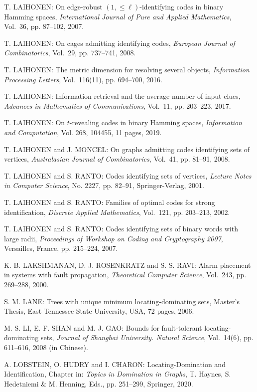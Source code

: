 \begin{thebibliography}{999}
T. LAIHONEN: On edge-robust $(1,\leq\ell)$-identifying codes in binary Hamming spaces, {\it International Journal of Pure and Applied Mathematics}, Vol.~36, pp. 87--102, 2007.

T. LAIHONEN: On cages admitting identifying codes, {\it European Journal of Combinatorics}, Vol.~29, pp. 737--741, 2008.

T. LAIHONEN: The metric dimension for resolving several objects, {\it Information Processing Letters}, Vol.~116(11), pp. 694--700, 2016.

T. LAIHONEN: Information retrieval and the average number of input clues, {\it Advances in Mathematics of Communications}, Vol.~11, pp. 203--223, 2017.

T. LAIHONEN: On $t$-revealing codes in binary Hamming spaces, {\it Information and Computation}, Vol. 268, 104455, 11 pages, 2019.

T. LAIHONEN and J. MONCEL: On graphs admitting codes identifying sets of vertices, {\it Australasian Journal of Combinatorics}, Vol.~41, pp. 81--91, 2008.

T. LAIHONEN and S. RANTO: Codes identifying sets of vertices, {\it Lecture Notes in Computer Science}, No. 2227, pp. 82--91, Springer-Verlag, 2001.

T. LAIHONEN and S. RANTO: Families of optimal codes for strong identification, {\it Discrete Applied Mathematics}, Vol.~121, pp. 203--213, 2002.

T. LAIHONEN and S. RANTO: Codes identifying sets of binary words with large radii, {\it Proceedings of Workshop on Coding and Cryptography 2007}, Versailles, France, pp. 215--224, 2007.

K. B. LAKSHMANAN, D. J. ROSENKRATZ and S. S. RAVI: Alarm placement in systems with fault propagation, {\it Theoretical Computer Science}, Vol.~243, pp. 269--288, 2000.

S. M. LANE: Trees with unique minimum locating-dominating sets, Master's Thesis, East Tennessee State University, USA, 72 pages, 2006.

M. S. LI, E. F. SHAN and M. J. GAO: Bounds for fault-tolerant locating-dominating sets, {\it Journal of Shanghai University. Natural Science}, Vol.~14(6), pp. 611--616, 2008 (in Chinese).

A. LOBSTEIN, O. HUDRY and I. CHARON: Locating-Domination and Identification, Chapter in: {\it Topics in Domination in Graphs}, T. Haynes, S. Hedetniemi \& M. Henning, Eds., pp. 251--299, Springer, 2020.


\end{thebibliography}
